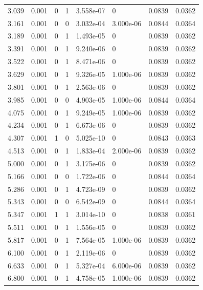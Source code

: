 \documentclass[preview]{standalone}
\begin{document}
{{\begin{tabular}{L{1.2cm}C{1.2cm} C{0.3cm}C{0.5cm} C{1.4cm}C{1.4cm} C{1.4cm}C{1.4cm}}
  3.039  &  0.001  & 0     &  1 &  3.558e-07  & 0  & 0.0839 &  0.0362   \\ 
  3.161  &  0.001  & 0     &  0 &  3.032e-04  & 3.000e-06  & 0.0844 &  0.0364   \\ 
  3.189  &  0.001  & 0     &  1 &  1.493e-05  & 0  & 0.0839 &  0.0362   \\ 
  3.391  &  0.001  & 0     &  1 &  9.240e-06  & 0  & 0.0839 &  0.0362   \\ 
  3.522  &  0.001  & 0     &  1 &  8.471e-06  & 0  & 0.0839 &  0.0362   \\ 
  3.629  &  0.001  & 0     &  1 &  9.326e-05  & 1.000e-06  & 0.0839 &  0.0362   \\ 
  3.801  &  0.001  & 0     &  1 &  2.563e-06  & 0  & 0.0839 &  0.0362   \\ 
  3.985  &  0.001  & 0     &  0 &  4.903e-05  & 1.000e-06  & 0.0844 &  0.0364   \\ 
  4.075  &  0.001  & 0     &  1 &  9.249e-05  & 1.000e-06  & 0.0839 &  0.0362   \\ 
  4.234  &  0.001  & 0     &  1 &  6.673e-06  & 0  & 0.0839 &  0.0362   \\ 
  4.307  &  0.001  & 1     &  0 &  5.025e-10  & 0  & 0.0843 &  0.0363   \\ 
  4.513  &  0.001  & 0     &  1 &  1.833e-04  & 2.000e-06  & 0.0839 &  0.0362   \\ 
  5.000  &  0.001  & 0     &  1 &  3.175e-06  & 0  & 0.0839 &  0.0362   \\ 
  5.166  &  0.001  & 0     &  0 &  1.722e-06  & 0  & 0.0844 &  0.0364   \\ 
  5.286  &  0.001  & 0     &  1 &  4.723e-09  & 0  & 0.0839 &  0.0362   \\ 
  5.343  &  0.001  & 0     &  0 &  6.542e-09  & 0  & 0.0844 &  0.0364   \\ 
  5.347  &  0.001  & 1     &  1 &  3.014e-10  & 0  & 0.0838 &  0.0361   \\ 
  5.511  &  0.001  & 0     &  1 &  1.556e-05  & 0  & 0.0839 &  0.0362   \\ 
  5.817  &  0.001  & 0     &  1 &  7.564e-05  & 1.000e-06  & 0.0839 &  0.0362   \\ 
  6.100  &  0.001  & 0     &  1 &  2.119e-06  & 0  & 0.0839 &  0.0362   \\ 
  6.633  &  0.001  & 0     &  1 &  5.327e-04  & 6.000e-06  & 0.0839 &  0.0362   \\ 
  6.800  &  0.001  & 0     &  1 &  4.758e-05  & 1.000e-06  & 0.0839 &  0.0362   \\ 

\end{tabular}}}
\end{document}
